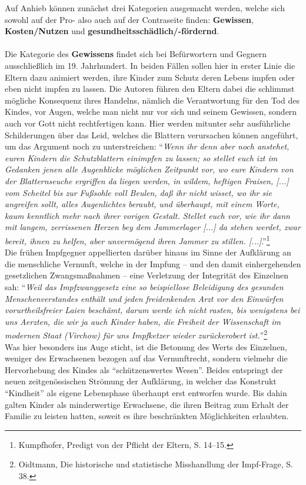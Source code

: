 \documentclass[
    a4paper,
    12pt,
    hyphens,
    chapterprefix=true,
    headheight=33pt,
    footheight=29pt,
    headings=optiontohead, %
]{scrartcl}
\begin{document}
{Auf Anhieb können zunächst drei Kategorien ausgemacht werden, welche sich sowohl auf der Pro- also auch auf der Contraseite finden: \textbf{Gewissen}, \textbf{Kosten/Nutzen} und \textbf{gesundheitsschädlich/-fördernd}.\\
\\
Die Kategorie des \textbf{Gewissens} findet sich bei Befürwortern und Gegnern ausschließlich im 19. Jahrhundert. In beiden Fällen sollen hier in erster Linie die Eltern dazu animiert werden, ihre Kinder zum Schutz deren Lebens impfen oder eben nicht impfen zu lassen. Die Autoren führen den Eltern dabei die schlimmst mögliche Konsequenz ihres Handelns, nämlich die Verantwortung für den Tod des Kindes, vor Augen, welche man nicht nur vor sich und seinem Gewissen, sondern auch vor Gott nicht rechtfertigen kann. Hier werden mitunter sehr ausführliche Schilderungen über das Leid, welches die Blattern verursachen können angeführt, um das Argument noch zu unterstreichen: "`\textit{Wenn ihr denn aber noch anstehet, euren Kindern die Schutzblattern einimpfen zu lassen; so stellet euch izt im Gedanken jenen alle Augenblicke möglichen Zeitpunkt vor, wo eure Kindern von der Blatternseuche ergriffen da liegen werden, in wildem, heftigen Fraisen, [...] vom Scheitel bis zur Fußsohle voll Beulen, daß ihr nicht wisset, wo ihr sie angreifen sollt,  alles Augenlichtes beraubt, und überhaupt, mit einem Worte, kaum kenntlich mehr nach ihrer vorigen Gestalt. Stellet euch vor, wie ihr dann mit langem, zerrissenen Herzen bey dem Jammerlager [...] da stehen werdet, zwar bereit, ihnen zu helfen, aber unvermögend ihren Jammer zu stillen. [...]}."'\footnote{Kumpfhofer, Predigt von der Pflicht der Eltern, S. 14--15.}\\
Die frühen Impfgegner appellierten darüber hinaus im Sinne der Aufklärung an die menschliche Vernunft, welche in der Impfung -- und den damit einhergehenden gesetzlichen Zwangsmaßnahmen -- eine Verletzung der Integrität des Einzelnen sah: "`\textit{Weil das Impfzwanggesetz eine so beispiellose Beleidigung des gesunden Menschenverstandes enthält und jeden freidenkenden Arzt vor den Einwürfen vorurtheilsfreier Laien beschämt, darum werde ich nicht rasten, bis wenigstens bei uns Aerzten, die wir ja auch Kinder haben, die Freiheit der Wissenschaft im modernen Staat (Virchow) für uns Impfketzer wieder zurückerobert ist.}"'\footnote{Oidtmann, Die historische und statistische Misshandlung der Impf-Frage, S. 38.}\\
Was hier besonders ins Auge sticht, ist die Betonung des Werts des Einzelnen, weniger des Erwachsenen bezogen auf das Vernunftrecht, sondern vielmehr die Hervorhebung des Kindes als "`schützenswertes Wesen"'. Beides entspringt der neuen zeitgenössischen Strömung der Aufklärung, in welcher das Konstrukt "`Kindheit"' als eigene Lebensphase überhaupt erst entworfen wurde. Bis dahin galten Kinder als minderwertige Erwachsene, die ihren Beitrag zum Erhalt der Familie zu leisten hatten, soweit es ihre beschränkten Möglichkeiten erlaubten. 
}
\end{document}
